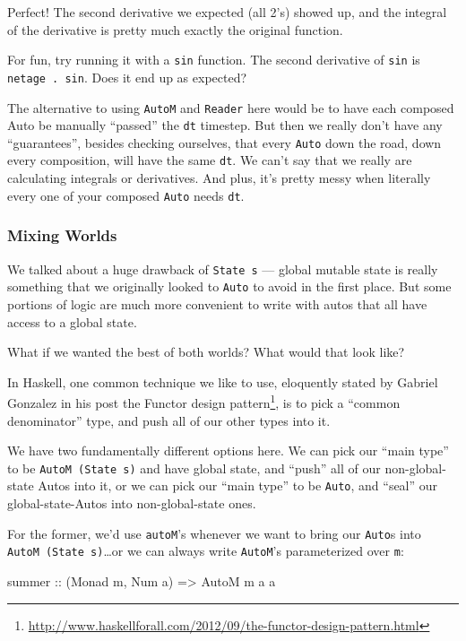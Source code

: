 \documentclass[]{article}
\newenvironment{Shaded}{}{}
\newcommand{\DataTypeTok}[1]{\textcolor[rgb]{0.56,0.13,0.00}{{#1}}}
\newcommand{\OtherTok}[1]{\textcolor[rgb]{0.00,0.44,0.13}{{#1}}}
\newcommand{\NormalTok}[1]{{#1}}
\renewcommand{\href}[2]{#2\footnote{\url{#1}}}
\begin{document}
Perfect! The second derivative we expected (all 2's) showed up, and the
integral of the derivative is pretty much exactly the original function.

For fun, try running it with a \texttt{sin} function. The second
derivative of \texttt{sin} is \texttt{netage\ .\ sin}. Does it end up as
expected?

The alternative to using \texttt{AutoM} and \texttt{Reader} here would
be to have each composed Auto be manually ``passed'' the \texttt{dt}
timestep. But then we really don't have any ``guarantees'', besides
checking ourselves, that every \texttt{Auto} down the road, down every
composition, will have the same \texttt{dt}. We can't say that we really
are calculating integrals or derivatives. And plus, it's pretty messy
when literally every one of your composed \texttt{Auto} needs
\texttt{dt}.

\subsubsection{Mixing Worlds}\label{mixing-worlds}

We talked about a huge drawback of \texttt{State\ s} --- global mutable
state is really something that we originally looked to \texttt{Auto} to
avoid in the first place. But some portions of logic are much more
convenient to write with autos that all have access to a global state.

What if we wanted the best of both worlds? What would that look like?

In Haskell, one common technique we like to use, eloquently stated by
Gabriel Gonzalez in his post
\href{http://www.haskellforall.com/2012/09/the-functor-design-pattern.html}{the
Functor design pattern}, is to pick a ``common denominator'' type, and
push all of our other types into it.

We have two fundamentally different options here. We can pick our ``main
type'' to be \texttt{AutoM\ (State\ s)} and have global state, and
``push'' all of our non-global-state Autos into it, or we can pick our
``main type'' to be \texttt{Auto}, and ``seal'' our global-state-Autos
into non-global-state ones.

For the former, we'd use \texttt{autoM}'s whenever we want to bring our
\texttt{Auto}s into \texttt{AutoM\ (State\ s)}\ldots{}or we can always
write \texttt{AutoM}'s parameterized over \texttt{m}:

\begin{Shaded}
\begin{Highlighting}[]
\OtherTok{summer ::} \NormalTok{(}\DataTypeTok{Monad} \NormalTok{m, }\DataTypeTok{Num} \NormalTok{a) }\OtherTok{=>} \DataTypeTok{AutoM} \NormalTok{m a a}
\end{Highlighting}
\end{Shaded}
\end{document}

